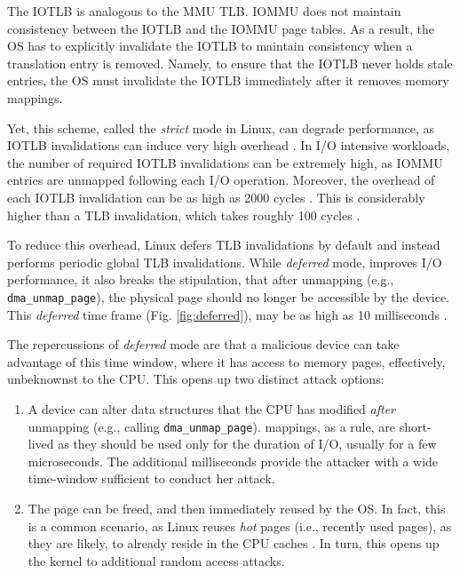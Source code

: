 The IOTLB is analogous to the MMU TLB. IOMMU does not maintain consistency between the IOTLB and the IOMMU page tables. As a result, the OS has to explicitly invalidate the IOTLB to maintain consistency when a translation entry is removed. Namely, to ensure that the IOTLB never holds stale entries, the OS must invalidate the IOTLB immediately after it removes memory mappings. 

Yet, this scheme, called the \emph{strict} mode in Linux, can degrade performance, as IOTLB invalidations can induce very high overhead \cite{MMT16,MSMT18,Peleg15}. In I/O intensive workloads, the number of required IOTLB invalidations can be extremely high, as IOMMU entries are unmapped following each I/O operation. Moreover, the overhead of each IOTLB invalidation can be as high as 2000 cycles \cite{ABYTS11}. This is considerably higher than a TLB invalidation, which takes roughly 100 cycles \cite{Han14}. 

To reduce this overhead, Linux defers TLB invalidations by default and instead performs periodic global TLB invalidations. While \emph{deferred} mode, improves I/O performance, it also breaks the stipulation, that after unmapping (e.g., \texttt{dma\_unmap\_page}), the physical page should no longer be accessible by the device. This \emph{deferred} time frame (Fig. \ref{fig:deferred}), may be as high as 10 milliseconds \cite{MSMT18}.

The repercussions of \emph{deferred} mode are that a malicious device can take advantage of this time window, where it has access to memory pages, effectively, unbeknownst to the CPU. This opens up two distinct attack options:

\begin{enumerate}
    \item A device can alter data structures that the CPU has modified \emph{after} unmapping (e.g., calling \texttt{dma\_unmap\_page}).
    \iova{} mappings, as a rule, are short-lived as they should be used only for the duration of I/O, usually for a few microseconds. The additional milliseconds provide the attacker with a wide time-window sufficient to conduct her attack.
    \item The page can be freed, and then immediately reused by the OS. In fact, this is a common scenario, as Linux reuses \emph{hot} pages (i.e., recently used pages), as they are likely, to already reside in the CPU caches \cite{hotcold}. In turn, this opens up the kernel to additional random access attacks.
\end{enumerate}

